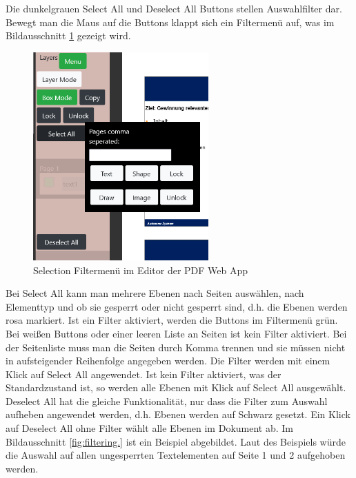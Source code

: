 Die dunkelgrauen Select All und Deselect All Buttons stellen Auswahlfilter dar. Bewegt man die Maus auf die Buttons klappt sich ein Filtermenü auf, was im Bildausschnitt \ref{fig:filtermenu} gezeigt wird. 

\begin{figure}[!htbp]
	\centering
	\includegraphics[width=0.6\textwidth]{"images/filtermenu.png"}
	\caption{Selection Filtermenü im Editor der PDF Web App}
	\label{fig:filtermenu}
\end{figure}

Bei Select All kann man mehrere Ebenen nach Seiten auswählen, nach Elementtyp und ob sie gesperrt oder nicht gesperrt sind, d.h. die Ebenen werden rosa markiert. Ist ein Filter aktiviert, werden die Buttons im Filtermenü grün. Bei weißen Buttons oder einer leeren Liste an Seiten ist kein Filter aktiviert. Bei der Seitenliste muss man die Seiten durch Komma trennen und sie müssen nicht in aufsteigender Reihenfolge angegeben werden. Die Filter werden mit einem Klick auf Select All angewendet. Ist kein Filter aktiviert, was der Standardzustand ist, so werden alle Ebenen mit Klick auf Select All ausgewählt. Deselect All hat die gleiche Funktionalität, nur dass die Filter zum Auswahl aufheben angewendet werden, d.h. Ebenen werden auf Schwarz gesetzt. Ein Klick auf Deselect All ohne Filter wählt alle Ebenen im Dokument ab. Im Bildausschnitt \ref{fig:filtering.} ist ein Beispiel abgebildet. Laut des Beispiels würde die Auswahl auf allen ungesperrten Textelementen auf Seite 1 und 2 aufgehoben werden. 


